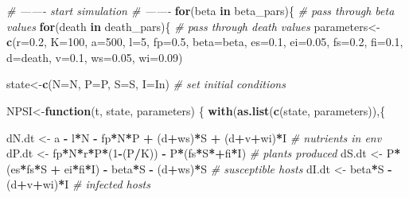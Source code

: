 \documentclass[10,portrait]{article}
\newenvironment{Shaded}{\begin{snugshade}}{\end{snugshade}}
\newcommand{\KeywordTok}[1]{\textcolor[rgb]{0.13,0.29,0.53}{\textbf{#1}}}
\newcommand{\DataTypeTok}[1]{\textcolor[rgb]{0.13,0.29,0.53}{#1}}
\newcommand{\DecValTok}[1]{\textcolor[rgb]{0.00,0.00,0.81}{#1}}
\newcommand{\FloatTok}[1]{\textcolor[rgb]{0.00,0.00,0.81}{#1}}
\newcommand{\StringTok}[1]{\textcolor[rgb]{0.31,0.60,0.02}{#1}}
\newcommand{\CommentTok}[1]{\textcolor[rgb]{0.56,0.35,0.01}{\textit{#1}}}
\newcommand{\ControlFlowTok}[1]{\textcolor[rgb]{0.13,0.29,0.53}{\textbf{#1}}}
\newcommand{\OperatorTok}[1]{\textcolor[rgb]{0.81,0.36,0.00}{\textbf{#1}}}
\newcommand{\NormalTok}[1]{#1}
\begin{document}
\begin{Shaded}
\begin{Highlighting}[]
  \CommentTok{# ------- start simulation # ------- }
  \ControlFlowTok{for}\NormalTok{(beta }\ControlFlowTok{in}\NormalTok{ beta_pars)\{ }\CommentTok{# pass through beta values}
    \ControlFlowTok{for}\NormalTok{(death }\ControlFlowTok{in}\NormalTok{ death_pars)\{ }\CommentTok{# pass through death values }
\NormalTok{      parameters<-}\KeywordTok{c}\NormalTok{(}\DataTypeTok{r=}\FloatTok{0.2}\NormalTok{, }\DataTypeTok{K=}\DecValTok{100}\NormalTok{, }\DataTypeTok{a=}\DecValTok{500}\NormalTok{, }\DataTypeTok{l=}\DecValTok{5}\NormalTok{, }\DataTypeTok{fp=}\FloatTok{0.5}\NormalTok{, }\DataTypeTok{beta=}\NormalTok{beta, }
                    \DataTypeTok{es=}\FloatTok{0.1}\NormalTok{, }\DataTypeTok{ei=}\FloatTok{0.05}\NormalTok{, }\DataTypeTok{fs=}\FloatTok{0.2}\NormalTok{, }\DataTypeTok{fi=}\FloatTok{0.1}\NormalTok{,}
                    \DataTypeTok{d=}\NormalTok{death, }\DataTypeTok{v=}\FloatTok{0.1}\NormalTok{, }\DataTypeTok{ws=}\FloatTok{0.05}\NormalTok{, }\DataTypeTok{wi=}\FloatTok{0.09}\NormalTok{)}
      
\NormalTok{      state<-}\KeywordTok{c}\NormalTok{(}\DataTypeTok{N=}\NormalTok{N, }\DataTypeTok{P=}\NormalTok{P, }\DataTypeTok{S=}\NormalTok{S, }\DataTypeTok{I=}\NormalTok{In) }\CommentTok{# set initial conditions}
      
\NormalTok{      NPSI<-}\ControlFlowTok{function}\NormalTok{(t, state, parameters) \{ }
        \KeywordTok{with}\NormalTok{(}\KeywordTok{as.list}\NormalTok{(}\KeywordTok{c}\NormalTok{(state, parameters)),\{}
          
\NormalTok{          dN.dt <-}\StringTok{ }\NormalTok{a }\OperatorTok{-}\StringTok{ }\NormalTok{l}\OperatorTok{*}\NormalTok{N }\OperatorTok{-}\StringTok{ }\NormalTok{fp}\OperatorTok{*}\NormalTok{N}\OperatorTok{*}\NormalTok{P }\OperatorTok{+}\StringTok{ }\NormalTok{(d}\OperatorTok{+}\NormalTok{ws)}\OperatorTok{*}\NormalTok{S }\OperatorTok{+}\StringTok{ }\NormalTok{(d}\OperatorTok{+}\NormalTok{v}\OperatorTok{+}\NormalTok{wi)}\OperatorTok{*}\NormalTok{I  }\CommentTok{# nutrients in env}
\NormalTok{          dP.dt <-}\StringTok{ }\NormalTok{fp}\OperatorTok{*}\NormalTok{N}\OperatorTok{*}\NormalTok{r}\OperatorTok{*}\NormalTok{P}\OperatorTok{*}\NormalTok{(}\DecValTok{1}\OperatorTok{-}\NormalTok{(P}\OperatorTok{/}\NormalTok{K)) }\OperatorTok{-}\StringTok{ }\NormalTok{P}\OperatorTok{*}\NormalTok{(fs}\OperatorTok{*}\NormalTok{S}\OperatorTok{*+}\NormalTok{fi}\OperatorTok{*}\NormalTok{I) }\CommentTok{# plants produced  }
\NormalTok{          dS.dt <-}\StringTok{ }\NormalTok{P}\OperatorTok{*}\NormalTok{(es}\OperatorTok{*}\NormalTok{fs}\OperatorTok{*}\NormalTok{S }\OperatorTok{+}\StringTok{ }\NormalTok{ei}\OperatorTok{*}\NormalTok{fi}\OperatorTok{*}\NormalTok{I) }\OperatorTok{-}\StringTok{ }\NormalTok{beta}\OperatorTok{*}\NormalTok{S }\OperatorTok{-}\StringTok{ }\NormalTok{(d}\OperatorTok{+}\NormalTok{ws)}\OperatorTok{*}\NormalTok{S }\CommentTok{# susceptible hosts }
\NormalTok{          dI.dt <-}\StringTok{ }\NormalTok{beta}\OperatorTok{*}\NormalTok{S }\OperatorTok{-}\StringTok{ }\NormalTok{(d}\OperatorTok{+}\NormalTok{v}\OperatorTok{+}\NormalTok{wi)}\OperatorTok{*}\NormalTok{I }\CommentTok{# infected hosts }
          

\end{Highlighting}
\end{Shaded}
\end{document}
